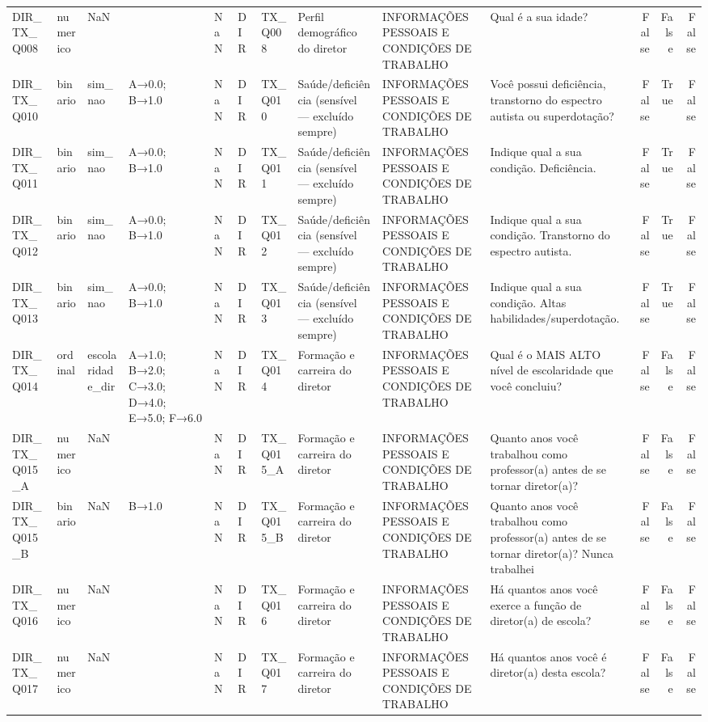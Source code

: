 \begin{tabular}{llllllllllrrr}
DIR\_TX\_Q008 & numerico & NaN &  & NaN & DIR & TX\_Q008 & Perfil demográfico do diretor & INFORMAÇÕES PESSOAIS E CONDIÇÕES DE TRABALHO & Qual é a sua idade? & False & False & False \\
DIR\_TX\_Q010 & binario & sim\_nao & A→0.0; B→1.0 & NaN & DIR & TX\_Q010 & Saúde/deficiência (sensível — excluído sempre) & INFORMAÇÕES PESSOAIS E CONDIÇÕES DE TRABALHO & Você possui deficiência, transtorno do espectro autista ou superdotação? & False & True & False \\
DIR\_TX\_Q011 & binario & sim\_nao & A→0.0; B→1.0 & NaN & DIR & TX\_Q011 & Saúde/deficiência (sensível — excluído sempre) & INFORMAÇÕES PESSOAIS E CONDIÇÕES DE TRABALHO & Indique qual a sua condição. Deficiência. & False & True & False \\
DIR\_TX\_Q012 & binario & sim\_nao & A→0.0; B→1.0 & NaN & DIR & TX\_Q012 & Saúde/deficiência (sensível — excluído sempre) & INFORMAÇÕES PESSOAIS E CONDIÇÕES DE TRABALHO & Indique qual a sua condição. Transtorno do espectro autista. & False & True & False \\
DIR\_TX\_Q013 & binario & sim\_nao & A→0.0; B→1.0 & NaN & DIR & TX\_Q013 & Saúde/deficiência (sensível — excluído sempre) & INFORMAÇÕES PESSOAIS E CONDIÇÕES DE TRABALHO & Indique qual a sua condição. Altas habilidades/superdotação. & False & True & False \\
DIR\_TX\_Q014 & ordinal & escolaridade\_dir & A→1.0; B→2.0; C→3.0; D→4.0; E→5.0; F→6.0 & NaN & DIR & TX\_Q014 & Formação e carreira do diretor & INFORMAÇÕES PESSOAIS E CONDIÇÕES DE TRABALHO & Qual é o MAIS ALTO nível de escolaridade que você concluiu? & False & False & False \\
DIR\_TX\_Q015\_A & numerico & NaN &  & NaN & DIR & TX\_Q015\_A & Formação e carreira do diretor & INFORMAÇÕES PESSOAIS E CONDIÇÕES DE TRABALHO & Quanto anos você trabalhou como professor(a) antes de se tornar diretor(a)? & False & False & False \\
DIR\_TX\_Q015\_B & binario & NaN & B→1.0 & NaN & DIR & TX\_Q015\_B & Formação e carreira do diretor & INFORMAÇÕES PESSOAIS E CONDIÇÕES DE TRABALHO & Quanto anos você trabalhou como professor(a) antes de se tornar diretor(a)? Nunca trabalhei & False & False & False \\
DIR\_TX\_Q016 & numerico & NaN &  & NaN & DIR & TX\_Q016 & Formação e carreira do diretor & INFORMAÇÕES PESSOAIS E CONDIÇÕES DE TRABALHO & Há quantos anos você exerce a função de diretor(a) de escola? & False & False & False \\
DIR\_TX\_Q017 & numerico & NaN &  & NaN & DIR & TX\_Q017 & Formação e carreira do diretor & INFORMAÇÕES PESSOAIS E CONDIÇÕES DE TRABALHO & Há quantos anos você é diretor(a) desta escola? & False & False & False \\

\end{tabular}
